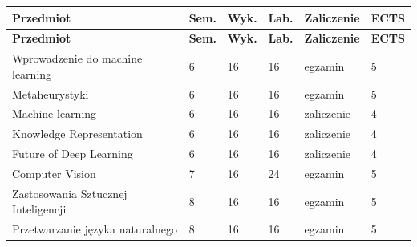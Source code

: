 \documentclass[12pt,a4paper]{article}
\newcommand{\thdrule}{\noalign{\global\setlength{\extrarowheight}{0pt}}}
\newcommand{\thdend}{\noalign{\global\setlength{\extrarowheight}{4pt}}}
\begin{document}
{\scriptsize
\begin{longtable}{m{6.5cm}m{0.7cm}m{1cm}m{1cm}m{1.7cm}m{0.7cm}}
\thdrule\toprule
\rowcolor{pjatkRed}
{\color{white}\footnotesize\textbf{\vphantom{Ag}Przedmiot}} & {\color{white}\footnotesize\textbf{\vphantom{Ag}Sem.}} & {\color{white}\footnotesize\textbf{\vphantom{Ag}Wyk.}} & {\color{white}\footnotesize\textbf{\vphantom{Ag}Lab.}} & {\color{white}\footnotesize\textbf{\vphantom{Ag}Zaliczenie}} & {\color{white}\footnotesize\textbf{\vphantom{Ag}ECTS}} \\
\midrule\thdend
\endfirsthead
\thdrule\toprule
\rowcolor{pjatkRed}
{\color{white}\footnotesize\textbf{\vphantom{Ag}Przedmiot}} & {\color{white}\footnotesize\textbf{\vphantom{Ag}Sem.}} & {\color{white}\footnotesize\textbf{\vphantom{Ag}Wyk.}} & {\color{white}\footnotesize\textbf{\vphantom{Ag}Lab.}} & {\color{white}\footnotesize\textbf{\vphantom{Ag}Zaliczenie}} & {\color{white}\footnotesize\textbf{\vphantom{Ag}ECTS}} \\
\midrule\thdend
\endhead
\rowcolor{tableRowLight} Wprowadzenie do machine learning & 6 & 16 & 16 & {\scriptsize egzamin} & 5 \\
\rowcolor{tableRowAlt} Metaheurystyki & 6 & 16 & 16 & {\scriptsize egzamin} & 5 \\
\rowcolor{tableRowLight} Machine learning & 6 & 16 & 16 & {\scriptsize zaliczenie} & 4 \\
\rowcolor{tableRowAlt} Knowledge Representation & 6 & 16 & 16 & {\scriptsize zaliczenie} & 4 \\
\rowcolor{tableRowLight} Future of Deep Learning & 6 & 16 & 16 & {\scriptsize zaliczenie} & 4 \\
\rowcolor{tableRowAlt} Computer Vision & 7 & 16 & 24 & {\scriptsize egzamin} & 5 \\
\rowcolor{tableRowLight} Zastosowania Sztucznej Inteligencji & 8 & 16 & 16 & {\scriptsize egzamin} & 5 \\
\rowcolor{tableRowAlt} Przetwarzanie języka naturalnego & 8 & 16 & 16 & {\scriptsize egzamin} & 5 \\
\bottomrule
\end{longtable}}
\end{document}

